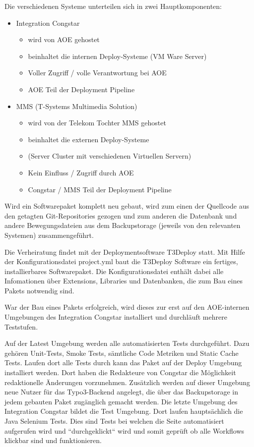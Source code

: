 \documentclass[11pt,a4paper]{article} %
\begin{document}
Die verschiedenen Systeme unterteilen sich in zwei Hauptkomponenten:
\begin{itemize}
  \item Integration Congstar
  \begin{itemize}
    \item wird von AOE gehostet
    \item beinhaltet die internen Deploy-Systeme (VM Ware Server)
    \item Voller Zugriff / volle Verantwortung bei AOE
    \item AOE Teil der Deployment Pipeline
  \end{itemize}
  \item MMS (T-Systems Multimedia Solution)
  \begin{itemize}
    \item wird von der Telekom Tochter MMS gehostet
    \item beinhaltet die externen Deploy-Systeme
    \item (Server Cluster mit verschiedenen Virtuellen Servern)
    \item Kein Einfluss / Zugriff durch AOE
    \item Congstar / MMS Teil der Deployment Pipeline
  \end{itemize}
\end{itemize}

Wird ein Softwarepaket komplett neu gebaut, wird zum einen der Quellcode aus den getagten Git-Repositories gezogen und zum anderen die Datenbank und andere Bewegungsdateien aus dem Backupstorage (jeweils von den relevanten Systemen) zusammengeführt.

Die Verheiratung findet mit der Deploymentsoftware T3Deploy statt. Mit Hilfe der Konfigurationsdatei project.yml baut die T3Deploy Software ein fertiges, installierbares Softwarepaket. Die Konfigurationsdatei enthält dabei alle Infomationen über Extensions, Libraries und Datenbanken, die zum Bau eines Pakets notwendig sind.

War der Bau eines Pakets erfolgreich, wird dieses zur erst auf den AOE-internen Umgebungen des Integration Congstar installiert und durchläuft mehrere Teststufen.

Auf der Latest Umgebung werden alle automatisierten Tests durchgeführt. Dazu gehören Unit-Tests, Smoke Tests, sämtliche Code Metriken und Static Cache Tests. Laufen dort alle Tests durch kann das Paket auf der Deploy Umgebung installiert werden. Dort haben die Redakteure von Congstar die Möglichkeit redaktionelle Änderungen vorzunehmen. Zusätzlich werden auf dieser Umgebung neue Nutzer für das Typo3-Backend angelegt, die über das Backupstorage in jedem gebauten Paket zugänglich gemacht werden. Die letzte Umgebung des Integration Congstar bildet die Test Umgebung. Dort laufen hauptsächlich die Java Selenium Tests. Dies sind Tests bei welchen die Seite automatisiert aufgerufen wird und “durchgeklickt“ wird und somit geprüft ob alle Workflows klickbar sind und funktionieren.
\end{document}
